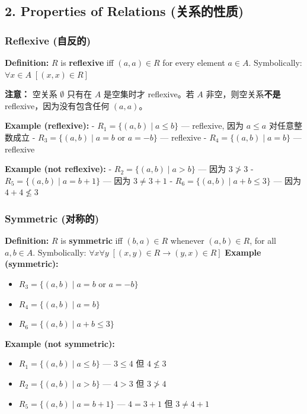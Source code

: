 \documentclass[10pt,a4paper,openany]{ctexbook}
\theoremstyle{definition}
\theoremstyle{remark}
\renewenvironment{quote}
  {\list{}{\leftmargin=1em\rightmargin=0pt\topsep=0.5pt\partopsep=0pt}\item[]}
  {\endlist}
\begin{document}
\subsection{2. Properties of Relations (关系的性质)}

\subsubsection{Reflexive (自反的)}

\textbf{Definition:} $R$ is \textbf{reflexive} iff $(a, a) \in R$ for every element $a \in A$.
Symbolically: $\forall x \in A \; [ (x, x) \in R ]$
\begin{quote}
\textbf{注意：} 空关系 $\emptyset$ 只有在 $A$ 是空集时才 reflexive。若 $A$ 非空，则空关系\textbf{不是} reflexive，因为没有包含任何 $(a,a)$。

\textbf{Example (reflexive):}
- $R_1 = \{(a,b) \mid a \le b\}$ — reflexive, 因为 $a \le a$ 对任意整数成立
- $R_3 = \{(a,b) \mid a = b \text{ or } a = -b\}$ — reflexive
- $R_4 = \{(a,b) \mid a = b\}$ — reflexive

\textbf{Example (not reflexive):}
- $R_2 = \{(a,b) \mid a > b\}$ — 因为 $3 \ngtr 3$
- $R_5 = \{(a,b) \mid a = b + 1\}$ — 因为 $3 \neq 3+1$
- $R_6 = \{(a,b) \mid a + b \le 3\}$ — 因为 $4+4 \nleq 3$

\end{quote}
\vspace{-2pt}

\subsubsection{Symmetric (对称的)}

\textbf{Definition:} $R$ is \textbf{symmetric} iff $(b,a) \in R$ whenever $(a,b) \in R$, for all $a, b \in A$.
Symbolically: $\forall x \forall y \; [ (x, y) \in R \longrightarrow (y, x) \in R ]$
\textbf{Example (symmetric):}
\begin{itemize}
\item $R_3 = \{(a,b) \mid a = b \text{ or } a = -b\}$
\item $R_4 = \{(a,b) \mid a = b\}$
\item $R_6 = \{(a,b) \mid a + b \le 3\}$

\end{itemize}

\textbf{Example (not symmetric):}
\begin{itemize}
\item $R_1 = \{(a,b) \mid a \le b\}$ — $3 \le 4$ 但 $4 \nleq 3$
\item $R_2 = \{(a,b) \mid a > b\}$ — $4 > 3$ 但 $3 \ngtr 4$
\item $R_5 = \{(a,b) \mid a = b + 1\}$ — $4 = 3+1$ 但 $3 \neq 4+1$

\end{itemize}
\end{document}
